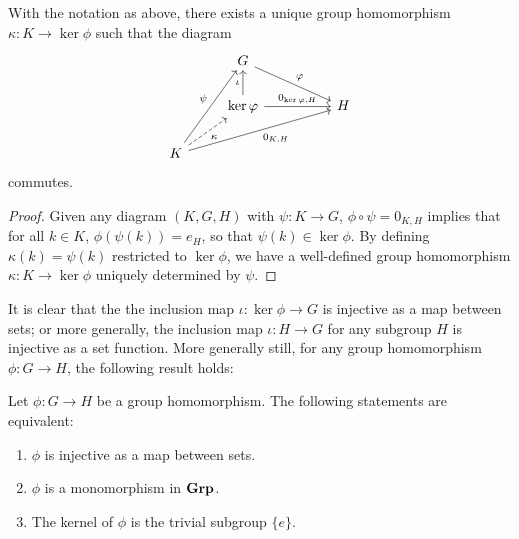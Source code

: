 \begin{theorem}
    With the notation as above, there exists a unique group homomorphism
    \(\kappa : K \to \ker \phi\) such that the diagram
    \[
        \begin{tikzcd}
            & G \arrow[rrd, "\phi"]                               &  &   \\
            & \ker\phi \arrow[u, "\iota"] \arrow[rr, "{0_{\ker\phi, H}}"] &  & H \\
        K \arrow[ruu, "\psi"] \arrow[rrru, "{0_{K,H}}"'] \arrow[ru, "\kappa"', dashed] &                                                     &  &  
        \end{tikzcd}
    \]
    commutes.
\end{theorem}

\begin{proof}
    Given any diagram \((K, G, H)\) with \(\psi: K \to G\), \(\phi \circ \psi =
    0_{K,H}\) implies that for all \(k \in K\), \(\phi(\psi(k)) = e_H\), so that
    \(\psi(k) \in \ker \phi\). By defining \(\kappa(k) = \psi(k)\) restricted to
    \(\ker \phi\), we have a well-defined group homomorphism \(\kappa: K \to
    \ker \phi\) uniquely determined by \(\psi\).
\end{proof}


It is clear that the the inclusion map \(\iota: \ker \phi \to G\) is injective
as a map between sets; or more generally, the inclusion map \(\iota: H \to G\)
for any subgroup \(H\) is injective as a set function. More generally still, for
any group homomorphism \(\phi: G \to H\), the following result holds:

\begin{theorem}
    \label{thm:kernel-injective-grp}
    Let \(\phi: G \to H\) be a group homomorphism. The following statements are
    equivalent:
    \begin{enumerate}[label=(\alph*)]
        \item \(\phi\) is injective as a map between sets.
        \item \(\phi\) is a monomorphism in \(\mathbf{Grp}\).
        \item The kernel of \(\phi\) is the trivial subgroup \(\{e\}\).
    \end{enumerate}
\end{theorem}

